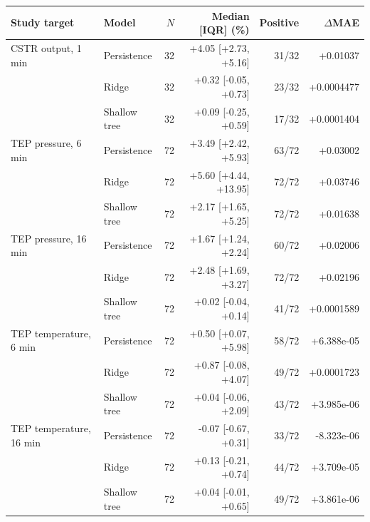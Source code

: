 \begin{tabular}{@{}llrrrr@{}}
\toprule
Study target & Model & $N$ & Median [IQR] (\%) & Positive & $\Delta$MAE \\
\midrule
CSTR output, 1 min & Persistence & 32 & +4.05 [+2.73, +5.16] & 31/32 & +0.01037 \\
 & Ridge & 32 & +0.32 [-0.05, +0.73] & 23/32 & +0.0004477 \\
 & Shallow tree & 32 & +0.09 [-0.25, +0.59] & 17/32 & +0.0001404 \\
\addlinespace
TEP pressure, 6 min & Persistence & 72 & +3.49 [+2.42, +5.93] & 63/72 & +0.03002 \\
 & Ridge & 72 & +5.60 [+4.44, +13.95] & 72/72 & +0.03746 \\
 & Shallow tree & 72 & +2.17 [+1.65, +5.25] & 72/72 & +0.01638 \\
\addlinespace
TEP pressure, 16 min & Persistence & 72 & +1.67 [+1.24, +2.24] & 60/72 & +0.02006 \\
 & Ridge & 72 & +2.48 [+1.69, +3.27] & 72/72 & +0.02196 \\
 & Shallow tree & 72 & +0.02 [-0.04, +0.14] & 41/72 & +0.0001589 \\
\addlinespace
TEP temperature, 6 min & Persistence & 72 & +0.50 [+0.07, +5.98] & 58/72 & +6.388e-05 \\
 & Ridge & 72 & +0.87 [-0.08, +4.07] & 49/72 & +0.0001723 \\
 & Shallow tree & 72 & +0.04 [-0.06, +2.09] & 43/72 & +3.985e-06 \\
\addlinespace
TEP temperature, 16 min & Persistence & 72 & -0.07 [-0.67, +0.31] & 33/72 & -8.323e-06 \\
 & Ridge & 72 & +0.13 [-0.21, +0.74] & 44/72 & +3.709e-05 \\
 & Shallow tree & 72 & +0.04 [-0.01, +0.65] & 49/72 & +3.861e-06 \\
\bottomrule
\end{tabular}
